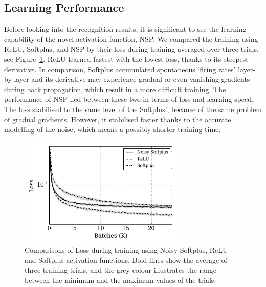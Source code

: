 	\subsection{Learning Performance}
	\label{subsec:result_compare}
	Before looking into the recognition results, it is significant to see the learning capability of the novel activation function, NSP.
	We compared the training using ReLU, Softplus, and NSP by their loss during training averaged over three trials, see Figure~\ref{Fig:loss_ns}.
	ReLU learned fastest with the lowest loss, thanks to its steepest derivative.
	In comparison, Softplus accumulated spontaneous `firing rates' layer-by-layer and its derivative may experience gradual or even vanishing gradients during back propagation, which result in a more difficult training.
	The performance of NSP lied between these two in terms of loss and learning speed.
	The loss stabilised to the same level of the Softplus', because of the same problem of gradual gradients.
	However, it stabilised faster thanks to the accurate modelling of the noise, which means a possibly shorter training time.
	\begin{figure}[tbp!]
		\centering
		\includegraphics[width=0.7\textwidth]{pics_iconip/8.png}
		\caption{Comparisons of Loss during training using Noisy Softplus, ReLU and Softplus activation functions. Bold lines show the average of three training trials, and the grey colour illustrates the range between the minimum and the maximum values of the trials.  }
		\label{Fig:loss_ns}
	\end{figure}

